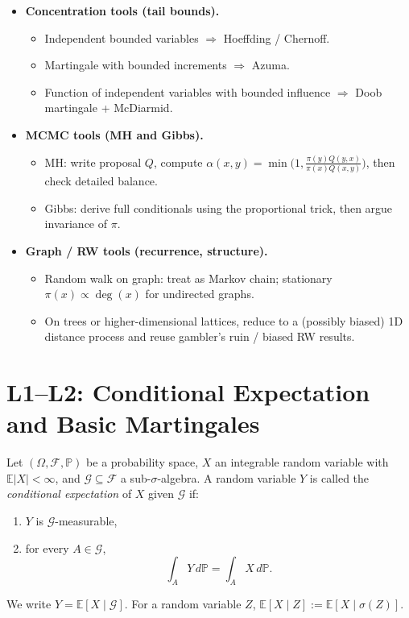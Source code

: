 \documentclass[answers,12pt,addpoints]{exam}
\begin{document}
\begin{itemize}
  \item \textbf{Concentration tools (tail bounds).}
  \begin{itemize}
    \item Independent bounded variables $\Rightarrow$ Hoeffding / Chernoff.
    \item Martingale with bounded increments $\Rightarrow$ Azuma.
    \item Function of independent variables with bounded influence $\Rightarrow$ Doob martingale + McDiarmid.
  \end{itemize}

  \item \textbf{MCMC tools (MH and Gibbs).}
  \begin{itemize}
    \item MH: write proposal $Q$, compute $\alpha(x,y)=\min\big(1,\frac{\pi(y)Q(y,x)}{\pi(x)Q(x,y)}\big)$, then check detailed balance.
    \item Gibbs: derive full conditionals using the proportional trick, then argue invariance of $\pi$.
  \end{itemize}

  \item \textbf{Graph / RW tools (recurrence, structure).}
  \begin{itemize}
    \item Random walk on graph: treat as Markov chain; stationary $\pi(x)\propto\deg(x)$ for undirected graphs.
    \item On trees or higher-dimensional lattices, reduce to a (possibly biased) 1D distance process and reuse gambler’s ruin / biased RW results.
  \end{itemize}
\end{itemize}

\section{L1–L2: Conditional Expectation and Basic Martingales}

\begin{definition}
Let $(\Omega,\mathcal{F},\mathbb{P})$ be a probability space, $X$ an integrable random variable with $\mathbb{E}|X|<\infty$, and $\mathcal{G}\subseteq\mathcal{F}$ a sub-$\sigma$-algebra. A random variable $Y$ is called the \emph{conditional expectation} of $X$ given $\mathcal{G}$ if:
\begin{enumerate}
\item $Y$ is $\mathcal{G}$-measurable,
\item for every $A\in\mathcal{G}$,
\[
\int_A Y\,d\mathbb{P} = \int_A X\,d\mathbb{P}.
\]
\end{enumerate}
We write $Y = \mathbb{E}[X\mid \mathcal{G}]$. For a random variable $Z$, $\mathbb{E}[X\mid Z] := \mathbb{E}[X\mid \sigma(Z)]$.
\end{definition}
\end{document}
